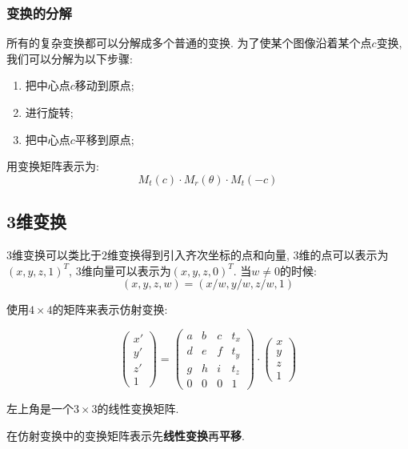\subsubsection{变换的分解}

所有的复杂变换都可以分解成多个普通的变换. 为了使某个图像沿着某个点$c$变换, 我们可以分解为以下步骤: 

\begin{enumerate}
	\item 把中心点$c$移动到原点; 
	\item 进行旋转; 
	\item 把中心点$c$平移到原点; 
\end{enumerate}

用变换矩阵表示为: 
\begin{equation}
	M_{t}(c)\cdot M_{r}(\theta) \cdot M_{t}(-c)
\end{equation}

\subsection{3维变换}

$3$维变换可以类比于$2$维变换得到引入齐次坐标的点和向量, $3$维的点可以表示为$(x,y,z,1)^T$, 3维向量可以表示为$(x,y,z,0)^T$. 当$w\ne 0$的时候: 
\begin{equation}
	(x,y,z,w)=(x/w,y/w,z/w,1)
\end{equation}

使用$4\times 4$的矩阵来表示仿射变换: 

\begin{equation}
	\begin{pmatrix}x'\\y'\\z'\\1\end{pmatrix}=\begin{pmatrix}a&b&c&t_x\\d&e&f&t_y\\g&h&i&t_z\\0&0&0&1\end{pmatrix}\cdot\begin{pmatrix}x\\y\\z\\1\end{pmatrix}
\end{equation}

左上角是一个$3\times 3$的线性变换矩阵. 

在仿射变换中的变换矩阵表示先\textbf{线性变换}再\textbf{平移}. 


